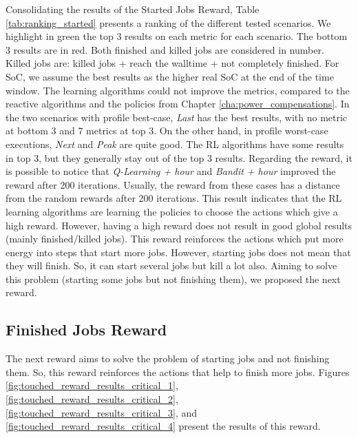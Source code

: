 Consolidating the results of the Started Jobs Reward, Table \ref{tab:ranking_started} presents a ranking of the different tested scenarios. We highlight in green the top 3 results on each metric for each scenario. The bottom 3 results are in red. Both finished and killed jobs are considered in number. Killed jobs are: killed jobs + reach the walltime + not completely finished. For SoC, we assume the best results as the higher real SoC at the end of the time window. The learning algorithms could not improve the metrics, compared to the reactive algorithms and the policies from Chapter \ref{cha:power_compensations}. In the two scenarios with profile best-case, \emph{Last} has the best results, with no metric at bottom 3 and 7 metrics at top 3. On the other hand, in profile worst-case executions, \emph{Next} and \emph{Peak} are quite good. The RL algorithms have some results in top 3, but they generally stay out of the top 3 results. Regarding the reward, it is possible to notice that \emph{Q-Learning + hour} and \emph{Bandit + hour} improved the reward after 200 iterations. Usually, the reward from these cases has a distance from the random rewards after 200 iterations. This result indicates that the RL learning algorithms are learning the policies to choose the actions which give a high reward. However, having a high reward does not result in good global results (mainly finished/killed jobs). This reward reinforces the actions which put more energy into steps that start more jobs. However, starting jobs does not mean that they will finish. So, it can start several jobs but kill a lot also. Aiming to solve this problem (starting some jobs but not finishing them), we proposed the next reward.



\clearpage

\subsection{Finished Jobs Reward}

The next reward aims to solve the problem of starting jobs and not finishing them. So, this reward reinforces the actions that help to finish more jobs. Figures \ref{fig:touched_reward_results_critical_1}, \ref{fig:touched_reward_results_critical_2}, \ref{fig:touched_reward_results_critical_3}, and \ref{fig:touched_reward_results_critical_4} present the results of this reward. 

